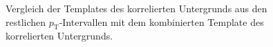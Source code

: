 \begin{figure}[t]
\begin{multicols}{2}
\end{multicols}
\caption{Vergleich der Templates des korrelierten Untergrunds aus den restlichen $p_\text{T}$-Intervallen mit dem kombinierten Template des korrelierten Untergrunds.}
\label{fig:OtherRatios}
\end{figure}
\clearpage



